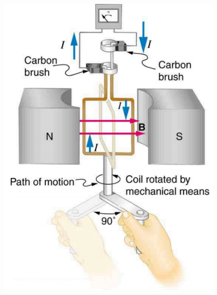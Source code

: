 \documentclass{beamer}
\begin{document}
\begin{frame}
\begin{figure}
    \centering
    \includegraphics[width=1\linewidth]{image.png}
\end{figure}
\end{frame}
\end{document}
